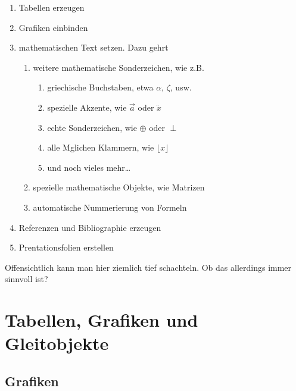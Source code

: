 \documentclass[11pt,a4paper]{article} %
\begin{document}
\begin{enumerate}
 \item Tabellen erzeugen
 \item Grafiken einbinden
 \item mathematischen Text setzen. Dazu gehrt
    \begin{enumerate}
       \item weitere mathematische Sonderzeichen, wie z.B.
           \begin{enumerate}
               \item griechische Buchstaben, etwa $\alpha$, $\zeta$, usw.
               \item spezielle Akzente, wie $\vec{a}$ oder $\ddot{x}$
               \item echte Sonderzeichen, wie $\oplus$ oder $\perp$
               \item alle Mglichen Klammern, wie $\lfloor x \rfloor$
               \item und noch vieles mehr\ldots
           \end{enumerate}
       \item spezielle mathematische Objekte, wie Matrizen
       \item automatische Nummerierung von Formeln
    \end{enumerate}
 \item Referenzen und Bibliographie erzeugen
 \item Prentationsfolien erstellen
\end{enumerate}

Offensichtlich kann man hier ziemlich tief schachteln. Ob das allerdings immer sinnvoll ist?



\section{Tabellen, Grafiken und Gleitobjekte}
\label{TabellenGrafikenFloats}


\subsection{Grafiken}
\label{Grafiken}
\end{document}
